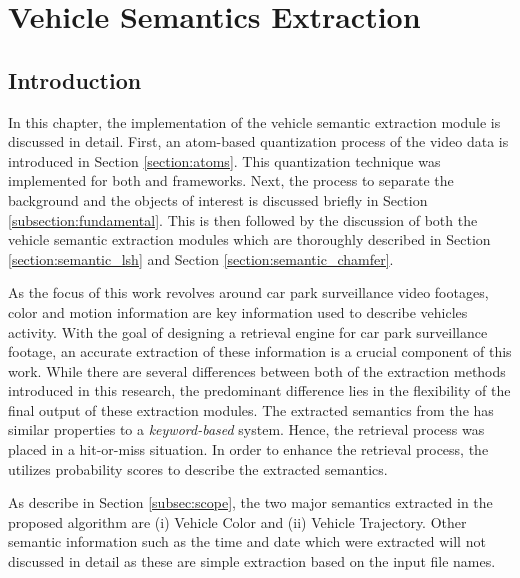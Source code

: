 \chapter{Vehicle Semantics Extraction}

\label{section:semanticsextraction}


\section{Introduction}

In this chapter, the implementation of the vehicle semantic extraction module is discussed in detail. 
First, an atom-based quantization process of the video data is introduced in Section \ref{section:atoms}. This quantization technique was implemented for both \versionOneExt and \versionTwoExt frameworks. Next, the process to separate the background and the objects of interest is discussed briefly in Section \ref{subsection:fundamental}. 
This is then followed by the discussion of both the vehicle semantic extraction modules which are thoroughly described in Section \ref{section:semantic_lsh} and Section \ref{section:semantic_chamfer}.


As the focus of this work revolves around car park surveillance video footages, color and motion information are key information used to describe vehicles activity. With the goal of designing a retrieval engine for car park surveillance footage, an accurate extraction of these information is a crucial component of this work. 
While there are several differences between both of the extraction methods introduced in this research, the predominant difference lies in the flexibility of the final output of these extraction modules.
The extracted semantics from the \versionOneExt has similar properties to a \textit{keyword-based} system. Hence, the retrieval process was placed in a hit-or-miss situation. In order to enhance the retrieval process, the \versionTwoExt utilizes probability scores to describe the extracted semantics.


As describe in Section \ref{subsec:scope}, the two major semantics extracted in the proposed algorithm are (i) Vehicle Color and (ii) Vehicle Trajectory. Other semantic information such as the time and date which were extracted will not discussed in detail as these are simple extraction based on the input file names.


